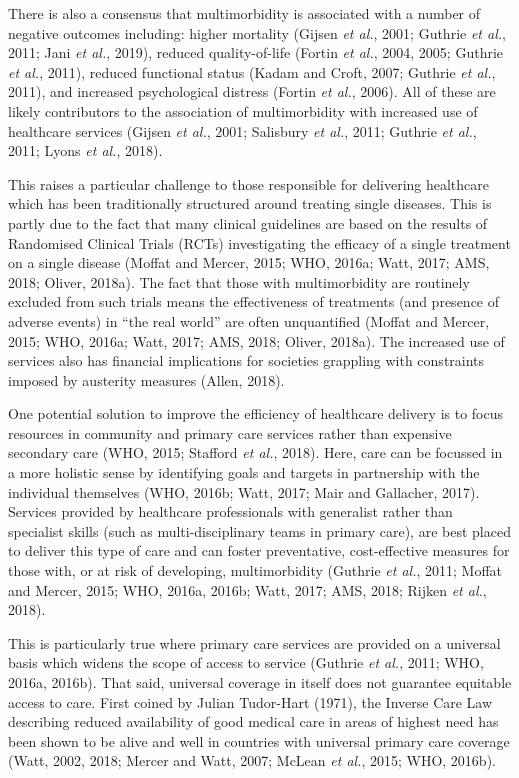 \documentclass[12pt,a4paper,oneside,table]{report}
\begin{document}
There is also a consensus that multimorbidity is associated with a
number of negative outcomes including: higher mortality (Gijsen \emph{et
al.}, 2001; Guthrie \emph{et al.}, 2011; Jani \emph{et al.}, 2019),
reduced quality-of-life (Fortin \emph{et al.}, 2004, 2005; Guthrie
\emph{et al.}, 2011), reduced functional status (Kadam and Croft, 2007;
Guthrie \emph{et al.}, 2011), and increased psychological distress
(Fortin \emph{et al.}, 2006). All of these are likely contributors to
the association of multimorbidity with increased use of healthcare
services (Gijsen \emph{et al.}, 2001; Salisbury \emph{et al.}, 2011;
Guthrie \emph{et al.}, 2011; Lyons \emph{et al.}, 2018).

This raises a particular challenge to those responsible for delivering
healthcare which has been traditionally structured around treating
single diseases. This is partly due to the fact that many clinical
guidelines are based on the results of Randomised Clinical Trials (RCTs)
investigating the efficacy of a single treatment on a single disease
(Moffat and Mercer, 2015; WHO, 2016a; Watt, 2017; AMS, 2018; Oliver,
2018a). The fact that those with multimorbidity are routinely excluded
from such trials means the effectiveness of treatments (and presence of
adverse events) in ``the real world'' are often unquantified (Moffat and
Mercer, 2015; WHO, 2016a; Watt, 2017; AMS, 2018; Oliver, 2018a). The
increased use of services also has financial implications for societies
grappling with constraints imposed by austerity measures (Allen, 2018).

One potential solution to improve the efficiency of healthcare delivery
is to focus resources in community and primary care services rather than
expensive secondary care (WHO, 2015; Stafford \emph{et al.}, 2018).
Here, care can be focussed in a more holistic sense by identifying goals
and targets in partnership with the individual themselves (WHO, 2016b;
Watt, 2017; Mair and Gallacher, 2017). Services provided by healthcare
professionals with generalist rather than specialist skills (such as
multi-disciplinary teams in primary care), are best placed to deliver
this type of care and can foster preventative, cost-effective measures
for those with, or at risk of developing, multimorbidity (Guthrie
\emph{et al.}, 2011; Moffat and Mercer, 2015; WHO, 2016a, 2016b; Watt,
2017; AMS, 2018; Rijken \emph{et al.}, 2018).

This is particularly true where primary care services are provided on a
universal basis which widens the scope of access to service (Guthrie
\emph{et al.}, 2011; WHO, 2016a, 2016b). That said, universal coverage
in itself does not guarantee equitable access to care. First coined by
Julian Tudor-Hart (1971), the Inverse Care Law describing reduced
availability of good medical care in areas of highest need has been
shown to be alive and well in countries with universal primary care
coverage (Watt, 2002, 2018; Mercer and Watt, 2007; McLean \emph{et al.},
2015; WHO, 2016b).
\end{document}
